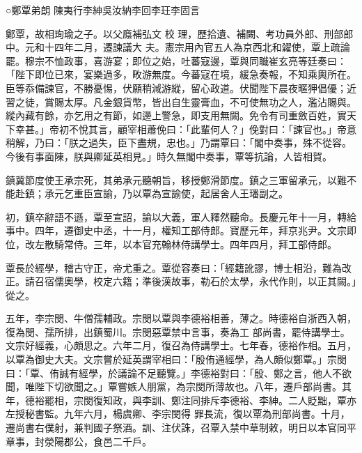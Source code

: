 
\begin{pinyinscope}

 ○鄭覃弟朗
 陳夷行李紳吳汝納李回李玨李固言



 鄭覃，故相珣瑜之子。以父廕補弘文
 校
 理，歷拾遺、補闕、考功員外郎、刑部郎中。元和十四年二月，遷諫議大
 夫。憲宗用內官五人為京西北和糴使，覃上疏論罷。穆宗不恤政事，喜游宴；即位之始，吐蕃寇邊，覃與同職崔玄亮等廷奏曰：「陛下即位已來，宴樂過多，畋游無度。今蕃寇在境，緩急奏報，不知乘輿所在。臣等忝備諫官，不勝憂惕，伏願稍減游縱，留心政道。伏聞陛下晨夜暱狎倡優；近習之徒，賞賜太厚。凡金銀貨幣，皆出自生靈膏血，不可使無功之人，濫沾賜與。縱內藏有餘，亦乞用之有節，如邊上警急，即支用無闕。免令有司重斂百姓，實天
 下幸甚。」帝初不悅其言，顧宰相蕭俛曰：「此輩何人？」俛對曰：「諫官也。」帝意稍解，乃曰：「朕之過失，臣下盡規，忠也。」乃謂覃曰：「閣中奏事，殊不從容。今後有事面陳，朕與卿延英相見。」時久無閣中奏事，覃等抗論，人皆相賀。



 鎮冀節度使王承宗死，其弟承元聽朝旨，移授鄭滑節度。鎮之三軍留承元，以難不能赴鎮；承元乞重臣宣諭，乃以覃為宣諭使，起居舍人王璠副之。



 初，鎮卒辭語不遜，覃至宣詔，諭以大義，軍人釋然聽命。長慶元年十一月，轉給
 事中。四年，遷御史中丞，十一月，權知工部侍郎。寶歷元年，拜京兆尹。文宗即位，改左散騎常侍。三年，以本官充翰林侍講學士。四年四月，拜工部侍郎。



 覃長於經學，稽古守正，帝尤重之。覃從容奏曰：「經籍訛謬，博士相沿，難為改正。請召宿儒奧學，校定六籍；準後漢故事，勒石於太學，永代作則，以正其闕。」從之。



 五年，李宗閔、牛僧孺輔政。宗閔以覃與李德裕相善，薄之。時德裕自浙西入朝，復為閔、孺所排，出鎮蜀川。宗閔惡覃禁中言事，奏為工
 部尚書，罷侍講學士。文宗好經義，心頗思之。六年二月，復召為侍講學士。七年春，德裕作相。五月，以覃為御史大夫。文宗嘗於延英謂宰相曰：「殷侑通經學，為人頗似鄭覃。」宗閔曰：「覃、侑誠有經學，於議論不足聽覽。」李德裕對曰：「殷、鄭之言，他人不欲聞，唯陛下切欲聞之。」覃嘗嫉人朋黨，為宗閔所薄故也。八年，遷戶部尚書。其年，德裕罷相，宗閔復知政，與李訓、鄭注同排斥李德裕、李紳。二人貶黜，覃亦左授秘書監。九年六月，楊虞卿、李宗閔得
 罪長流，復以覃為刑部尚書。十月，遷尚書右僕射，兼判國子祭酒。訓、注伏誅，召覃入禁中草制敕，明日以本官同平章事，封滎陽郡公，食邑二千戶。




\end{pinyinscope}
